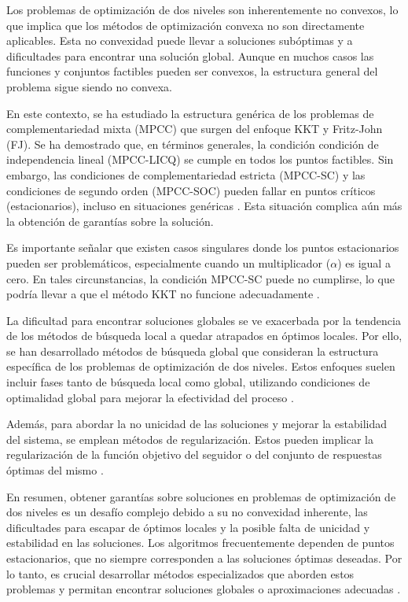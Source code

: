 Los problemas de optimización de dos niveles son inherentemente no convexos, lo que implica que los métodos de optimización convexa no son directamente aplicables. Esta no convexidad puede llevar a soluciones subóptimas y a dificultades para encontrar una solución global. Aunque en muchos casos las funciones y conjuntos factibles pueden ser convexos, la estructura general del problema sigue siendo no convexa.

En este contexto, se ha estudiado la estructura genérica de los problemas de complementariedad mixta (MPCC) que surgen del enfoque KKT y Fritz-John (FJ). Se ha demostrado que, en términos generales, la condición condición de independencia lineal (MPCC-LICQ) se cumple en todos los puntos factibles. Sin embargo, las condiciones de complementariedad estricta (MPCC-SC) y las condiciones de segundo orden (MPCC-SOC) pueden fallar en puntos críticos (estacionarios), incluso en situaciones genéricas \cite{Allende2012SolvingBP}. Esta situación complica aún más la obtención de garantías sobre la solución.

Es importante señalar que existen casos singulares donde los puntos estacionarios pueden ser problemáticos, especialmente cuando un multiplicador (\(\alpha\)) es igual a cero. En tales circunstancias, la condición MPCC-SC puede no cumplirse, lo que podría llevar a que el método KKT no funcione adecuadamente \cite{Allende2012SolvingBP}.

La dificultad para encontrar soluciones globales se ve exacerbada por la tendencia de los métodos de búsqueda local a quedar atrapados en óptimos locales. Por ello, se han desarrollado métodos de búsqueda global que consideran la estructura específica de los problemas de optimización de dos niveles. Estos enfoques suelen incluir fases tanto de búsqueda local como global, utilizando condiciones de optimalidad global para mejorar la efectividad del proceso \cite{DempeyZemkoho2020}.

Además, para abordar la no unicidad de las soluciones y mejorar la estabilidad del sistema, se emplean métodos de regularización. Estos pueden implicar la regularización de la función objetivo del seguidor o del conjunto de respuestas óptimas del mismo \cite{DempeyZemkoho2020}.

En resumen, obtener garantías sobre soluciones en problemas de optimización de dos niveles es un desafío complejo debido a su no convexidad inherente, las dificultades para escapar de óptimos locales y la posible falta de unicidad y estabilidad en las soluciones. Los algoritmos frecuentemente dependen de puntos estacionarios, que no siempre corresponden a las soluciones óptimas deseadas. Por lo tanto, es crucial desarrollar métodos especializados que aborden estos problemas y permitan encontrar soluciones globales o aproximaciones adecuadas \cite{DempeyZemkoho2020}.

